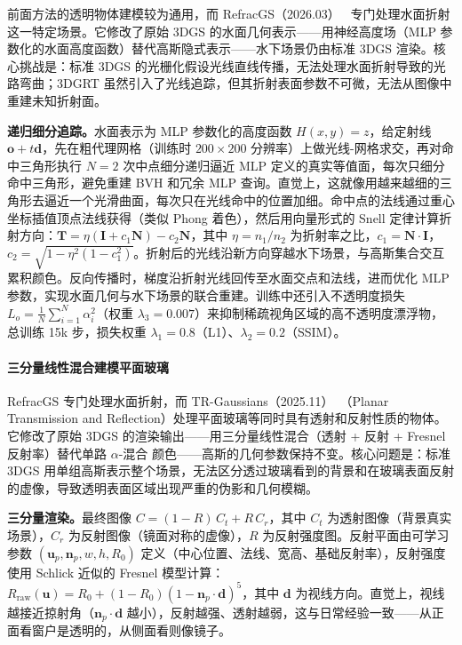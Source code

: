 前面方法的透明物体建模较为通用，而 RefracGS（2026.03）~\cite{2603_21695} 专门处理水面折射这一特定场景。它修改了原始 3DGS 的水面几何表示——用神经高度场（MLP 参数化的水面高度函数）替代高斯隐式表示——水下场景仍由标准 3DGS 渲染。核心挑战是：标准 3DGS 的光栅化假设光线直线传播，无法处理水面折射导致的光路弯曲；3DGRT 虽然引入了光线追踪，但其折射表面参数不可微，无法从图像中重建未知折射面。

\textbf{递归细分追踪。}水面表示为 MLP 参数化的高度函数 $H(x,y)=z$，给定射线 $\mathbf{o}+t\mathbf{d}$，先在粗代理网格（训练时 $200{\times}200$ 分辨率）上做光线-网格求交，再对命中三角形执行 $N{=}2$ 次中点细分递归逼近 MLP 定义的真实等值面，每次只细分命中三角形，避免重建 BVH 和冗余 MLP 查询。直觉上，这就像用越来越细的三角形去逼近一个光滑曲面，每次只在光线命中的位置加细。命中点的法线通过重心坐标插值顶点法线获得（类似 Phong 着色），然后用向量形式的 Snell 定律计算折射方向：$\mathbf{T} = \eta(\mathbf{I} + c_1\mathbf{N}) - c_2\mathbf{N}$，其中 $\eta{=}n_1/n_2$ 为折射率之比，$c_1{=}\mathbf{N}{\cdot}\mathbf{I}$，$c_2{=}\sqrt{1{-}\eta^2(1{-}c_1^2)}$。折射后的光线沿新方向穿越水下场景，与高斯集合交互累积颜色。反向传播时，梯度沿折射光线回传至水面交点和法线，进而优化 MLP 参数，实现水面几何与水下场景的联合重建。训练中还引入不透明度损失 $L_o = \frac{1}{N}\sum_{i=1}^{N}\alpha_i^2$（权重 $\lambda_3{=}0.007$）来抑制稀疏视角区域的高不透明度漂浮物，总训练 15k 步，损失权重 $\lambda_1{=}0.8$（L1）、$\lambda_2{=}0.2$（SSIM）。

\paragraph{三分量线性混合建模平面玻璃}

RefracGS 专门处理水面折射，而 TR-Gaussians（2025.11）~\cite{2511_13009}（Planar Transmission and Reflection）处理平面玻璃等同时具有透射和反射性质的物体。它修改了原始 3DGS 的渲染输出——用三分量线性混合（透射 + 反射 + Fresnel 反射率）替代单路 $\alpha$-混合 颜色——高斯的几何参数保持不变。核心问题是：标准 3DGS 用单组高斯表示整个场景，无法区分透过玻璃看到的背景和在玻璃表面反射的虚像，导致透明表面区域出现严重的伪影和几何模糊。

\textbf{三分量渲染。}最终图像 $C = (1{-}R)\,C_t + R\,C_r$，其中 $C_t$ 为透射图像（背景真实场景），$C_r$ 为反射图像（镜面对称的虚像），$R$ 为反射强度图。反射平面由可学习参数 $(\mathbf{u}_p, \mathbf{n}_p, w, h, R_0)$ 定义（中心位置、法线、宽高、基础反射率），反射强度使用 Schlick 近似的 Fresnel 模型计算：$R_{\text{raw}}(\mathbf{u}) = R_0 + (1{-}R_0)(1{-}\mathbf{n}_p{\cdot}\mathbf{d})^5$，其中 $\mathbf{d}$ 为视线方向。直觉上，视线越接近掠射角（$\mathbf{n}_p{\cdot}\mathbf{d}$ 越小），反射越强、透射越弱，这与日常经验一致——从正面看窗户是透明的，从侧面看则像镜子。

